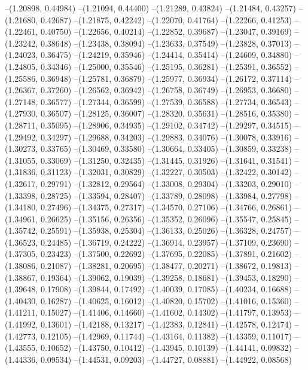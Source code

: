 --(1.20898, 0.44984)
--(1.21094, 0.44400)
--(1.21289, 0.43824)
--(1.21484, 0.43257)
--(1.21680, 0.42687)
--(1.21875, 0.42242)
--(1.22070, 0.41764)
--(1.22266, 0.41253)
--(1.22461, 0.40750)
--(1.22656, 0.40214)
--(1.22852, 0.39687)
--(1.23047, 0.39169)
--(1.23242, 0.38648)
--(1.23438, 0.38094)
--(1.23633, 0.37549)
--(1.23828, 0.37013)
--(1.24023, 0.36475)
--(1.24219, 0.35946)
--(1.24414, 0.35414)
--(1.24609, 0.34880)
--(1.24805, 0.34346)
--(1.25000, 0.35546)
--(1.25195, 0.36281)
--(1.25391, 0.36552)
--(1.25586, 0.36948)
--(1.25781, 0.36879)
--(1.25977, 0.36934)
--(1.26172, 0.37114)
--(1.26367, 0.37260)
--(1.26562, 0.36942)
--(1.26758, 0.36749)
--(1.26953, 0.36680)
--(1.27148, 0.36577)
--(1.27344, 0.36599)
--(1.27539, 0.36588)
--(1.27734, 0.36543)
--(1.27930, 0.36507)
--(1.28125, 0.36007)
--(1.28320, 0.35631)
--(1.28516, 0.35380)
--(1.28711, 0.35095)
--(1.28906, 0.34935)
--(1.29102, 0.34742)
--(1.29297, 0.34515)
--(1.29492, 0.34297)
--(1.29688, 0.34203)
--(1.29883, 0.34076)
--(1.30078, 0.33916)
--(1.30273, 0.33765)
--(1.30469, 0.33580)
--(1.30664, 0.33405)
--(1.30859, 0.33238)
--(1.31055, 0.33069)
--(1.31250, 0.32435)
--(1.31445, 0.31926)
--(1.31641, 0.31541)
--(1.31836, 0.31123)
--(1.32031, 0.30829)
--(1.32227, 0.30503)
--(1.32422, 0.30142)
--(1.32617, 0.29791)
--(1.32812, 0.29564)
--(1.33008, 0.29304)
--(1.33203, 0.29010)
--(1.33398, 0.28725)
--(1.33594, 0.28407)
--(1.33789, 0.28098)
--(1.33984, 0.27798)
--(1.34180, 0.27496)
--(1.34375, 0.27317)
--(1.34570, 0.27106)
--(1.34766, 0.26861)
--(1.34961, 0.26625)
--(1.35156, 0.26356)
--(1.35352, 0.26096)
--(1.35547, 0.25845)
--(1.35742, 0.25591)
--(1.35938, 0.25304)
--(1.36133, 0.25026)
--(1.36328, 0.24757)
--(1.36523, 0.24485)
--(1.36719, 0.24222)
--(1.36914, 0.23957)
--(1.37109, 0.23690)
--(1.37305, 0.23423)
--(1.37500, 0.22692)
--(1.37695, 0.22085)
--(1.37891, 0.21602)
--(1.38086, 0.21087)
--(1.38281, 0.20695)
--(1.38477, 0.20271)
--(1.38672, 0.19813)
--(1.38867, 0.19364)
--(1.39062, 0.19039)
--(1.39258, 0.18681)
--(1.39453, 0.18290)
--(1.39648, 0.17908)
--(1.39844, 0.17492)
--(1.40039, 0.17085)
--(1.40234, 0.16688)
--(1.40430, 0.16287)
--(1.40625, 0.16012)
--(1.40820, 0.15702)
--(1.41016, 0.15360)
--(1.41211, 0.15027)
--(1.41406, 0.14660)
--(1.41602, 0.14302)
--(1.41797, 0.13953)
--(1.41992, 0.13601)
--(1.42188, 0.13217)
--(1.42383, 0.12841)
--(1.42578, 0.12474)
--(1.42773, 0.12105)
--(1.42969, 0.11744)
--(1.43164, 0.11382)
--(1.43359, 0.11017)
--(1.43555, 0.10652)
--(1.43750, 0.10412)
--(1.43945, 0.10139)
--(1.44141, 0.09832)
--(1.44336, 0.09534)
--(1.44531, 0.09203)
--(1.44727, 0.08881)
--(1.44922, 0.08568)
